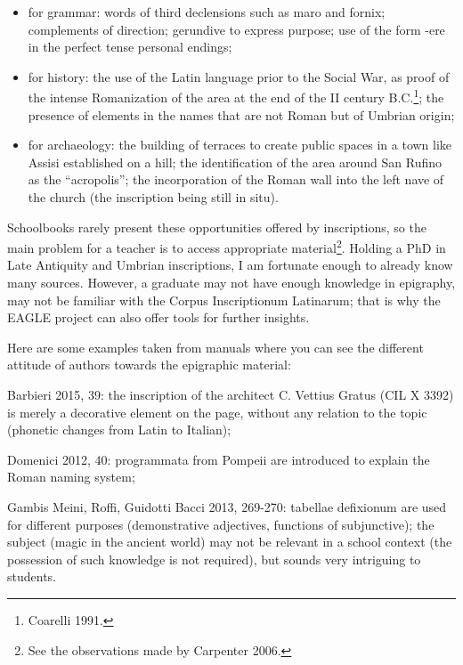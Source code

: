 \documentclass[amsthm,ebook]{saparticle}
\begin{document}
\begin{itemize}
\item for grammar: words of third declensions such as maro and fornix; complements of direction; gerundive to express
purpose; use of the form {}-ere in the perfect tense personal endings;
\item for history: the use of the Latin language prior to the Social War, as proof of the intense Romanization of the
area at the end of the II century B.C.\footnote{ Coarelli 1991.}; the presence of elements in the names that are not
Roman but of Umbrian origin;
\item for archaeology: the building of terraces to create public spaces in a town like Assisi established on a hill; the
identification of the area around San Rufino as the “acropolis”; the incorporation of the Roman wall into the left nave
of the church (the inscription being still in situ).
\end{itemize}

\bigskip

Schoolbooks rarely present these opportunities offered by inscriptions, so the main problem for a teacher is to access
appropriate material\footnote{ See the observations made by Carpenter 2006.}. Holding a PhD in Late Antiquity and
Umbrian inscriptions, I am fortunate enough to already know many sources. However, a graduate may not have enough
knowledge in epigraphy, may not be familiar with the Corpus Inscriptionum Latinarum; that is why the EAGLE project can
also offer tools for further insights.

Here are some examples taken from manuals where you can see the different attitude of authors towards the epigraphic
material:

\textwide{\FilledBigTriangleRight} Barbieri 2015, 39: the inscription of the architect C. Vettius Gratus (CIL X 3392) is
merely a decorative element on the page, without any relation to the topic (phonetic changes from Latin to Italian);

\textwide{\FilledBigTriangleRight} Domenici 2012, 40: programmata from Pompeii are introduced to explain the Roman
naming system;

\textwide{\FilledBigTriangleRight} Gambis Meini, Roffi, Guidotti Bacci 2013, 269-270: tabellae defixionum are used for
different purposes (demonstrative adjectives, functions of subjunctive); the subject (magic in the ancient world) may
not be relevant in a school context (the possession of such knowledge is not required), but sounds very intriguing to
students.
\end{document}
